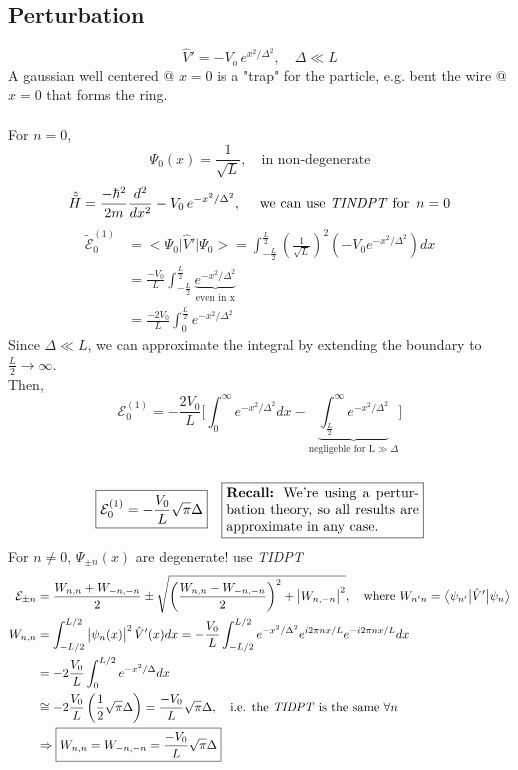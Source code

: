 \documentclass[12pt,fancychapters]{report}
\numberwithin{equation}{section}
\begin{document}
\subsection*{Perturbation}
\[
  \hat{V}' = -V_o\,e^{x^2/\Delta^2}, \quad \Delta \ll L
\]
A gaussian well centered @ $x=0$ is a "trap" for the particle, e.g. bent the wire @ $x=0$ that
forms the ring. \\
\\
For $n= 0$,
\[
  \Psi_0(x) = \frac{1}{\sqrt{L}}, \quad \text{in non-degenerate}
\]
\[
  \hat{ \tilde{H}} = \frac{-\hbar^2}{2m}\frac{d^2}{dx^2} - V_0\,e^{-x^2/\Delta^2}, \quad \text{
    we can use \emph{TINDPT} for
  }\,n=0
\]
\begin{align*}
  \tilde{\mathcal{E}}_0^{(1)} &=\big<\Psi_0\big|\hat{V}'\big|\Psi_0 \big> = \int_{-\frac{L}{2}}^
  {\frac{L}{2}}\left(\frac{1}{\sqrt{L}}\right)^2 \left(-V_0 e^{-x^2/\Delta^2}\right)dx\\
&= \frac{-V_0}{L}\int_{-\frac{L}{2}}^{\frac{L}{2}}\underbrace{e^{-x^2/\Delta^2}}_\text{even in x}\\
&=\frac{-2V_0}{L}\int_{0}^{\frac{L}{2}}e^{-x^2/\Delta^2} 
\end{align*}
Since $\Delta \ll L$, we can approximate the integral by extending the boundary to $\frac{L}{2}
\longrightarrow \infty$.
\\Then, 
\[\mathcal{E}^{(1)}_0 = -\frac{2V_0}{L}\Bigg[\int_{0}^{\infty} e^{-x^2/\Delta^2} dx
- \underbrace{\int_{\frac{L}{2}}^{\infty}e^{-x^2/\Delta^2}}_{\text{negligeble for L}\gg\Delta}
\Bigg]\]\\
\[
  \boxed{\mathcal{E}_0^{(1)} = -\frac{V_0}{L}\sqrt{\pi}\Delta}\quad
  \fbox{%
  \parbox{.4\textwidth}{%
  \textbf{Recall:} We're using a perturbation theory, so all results are 
  approximate in any case.
  }%
}
\]
For $n\neq 0$, $\Psi_{\pm n}(x)$ are degenerate! use \emph{TIDPT}
\begin{align*}
  \mathcal{E}_{\pm n} &=\frac{W_{n,n} +W_{-n,-n}}{2} \pm 
  \sqrt{\left(\frac{W_{n,n}
  - W_{-n,-n}}{2}\right)^2 + \big|W_{n, -n}\big|^2},\quad\text{where } W_{n'n} = 
  \big<\psi_{n'}\big|\hat{V}'\big|\psi_n\big>\\
  W_{n,n}&= \int_{-L/2}^{L/2}\big|\psi_n(x)\big|^2\, \hat{V}'(x)dx = -\frac{V_0}{L}\int_{-L/2}
  ^{L/2}e^{-x^2/\Delta^2}e^{i2\pi n x/L}e^{-i2\pi n x/L}dx\\
         &= -2\frac{V_0}{L}\int_{0}^{L/2} e^{-x^2/\Delta}dx\\
         &\cong -2\frac{V_0}{L}\left(\frac{1}{2}\sqrt{\pi}\Delta\right) = \frac{-V_0}{L}\sqrt
         {\pi}\Delta, \quad\text{i.e. the \emph{TIDPT} is the same }\forall n\\
         &\Rightarrow \boxed{W_{n,n}= W_{-n,-n} = \frac{-V_0}{L}\sqrt{\pi}\Delta}
\end{align*}
\end{document}
